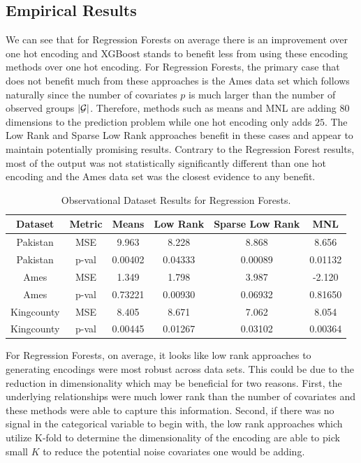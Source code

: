 \documentclass{article}
\theoremstyle{plain}
\theoremstyle{definition}
\theoremstyle{remark}
\begin{document}

\subsection{Empirical Results}


We can see that for Regression Forests on average there is an improvement over one hot encoding and XGBoost stands to benefit less from using these encoding methods over one hot encoding. For Regression Forests, the primary case that does not benefit much from these approaches is the Ames data set which follows naturally since the number of covariates $p$ is much larger than the number of observed groups $|\mathcal{G}|$. Therefore, methods such as means and MNL are adding $80$ dimensions to the prediction problem while one hot encoding only adds $25$. The Low Rank and Sparse Low Rank approaches benefit in these cases and appear to maintain potentially promising results. Contrary to the Regression Forest results, most of the output was not statistically significantly different than one hot encoding and the Ames data set was the closest evidence to any benefit.

\begin{table}[H]
	\centering
	\begin{tabular}{|c|c|c|c|c|c|}
		\hline
		Dataset& Metric & Means & Low Rank & Sparse Low Rank & MNL  \\
		\hline
		Pakistan & MSE & 9.963 &8.228 &8.868 &8.656 \\
		Pakistan & p-val& 0.00402 & 0.04333&0.00089 &0.01132 \\
		\hline
		Ames & MSE & 1.349 & 1.798&3.987 &-2.120\\
		Ames & p-val&0.73221&0.00930&0.06932&0.81650 \\
		\hline
		Kingcounty & MSE &8.405&8.671&7.062& 8.054\\
		Kingcounty & p-val&0.00445&0.01267&0.03102&0.00364 \\
		\hline
	\end{tabular}
	\caption{Observational Dataset Results for Regression Forests.}
	\label{tab:observational}
\end{table}
For Regression Forests, on average, it looks like low rank approaches to generating encodings were most robust across data sets. This could be due to the reduction in dimensionality which may be beneficial  for two reasons. First, the underlying relationships were much lower rank than the number of covariates and these methods were able to capture this information. Second, if there was no signal in the categorical variable to begin with, the low rank approaches which utilize K-fold to determine the dimensionality of the encoding are able to pick small $K$ to reduce the potential noise covariates one would be adding.
\end{document}
